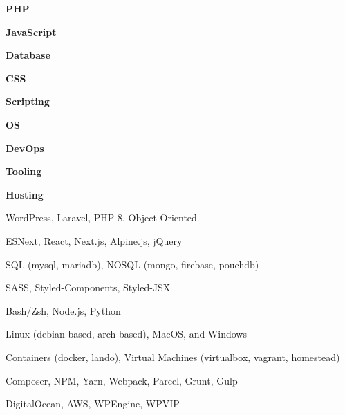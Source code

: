\documentclass{article}
\begin{document}
	\begin{multicols}{2}

		\textbf{PHP}
		\vspace{-1mm}

		\textbf{JavaScript}
		\vspace{-1mm}

		\textbf{Database}
		\vspace{-1mm}

		\textbf{CSS}
		\vspace{-1mm}

		\textbf{Scripting}
		\vspace{-1mm}

		\textbf{OS}
		\vspace{-1mm}

		\textbf{DevOps}
		\vspace{-1mm}

		\textbf{Tooling}
		\vspace{-1mm}

		\textbf{Hosting}
		\vspace{-1mm}

	\columnbreak

		WordPress, Laravel, PHP 8, Object-Oriented
		\vspace{-1mm}

		ESNext, React, Next.js, Alpine.js, jQuery
		\vspace{-1mm}

		SQL (mysql, mariadb), NOSQL (mongo, firebase, pouchdb)
		\vspace{-1mm}

		SASS, Styled-Components, Styled-JSX
		\vspace{-1mm}

		Bash/Zsh, Node.js, Python
		\vspace{-1mm}

		Linux (debian-based, arch-based), MacOS, and Windows
		\vspace{-1mm}

		Containers (docker, lando), Virtual Machines (virtualbox, vagrant, homestead)
		\vspace{-1mm}

		Composer, NPM, Yarn, Webpack, Parcel, Grunt, Gulp
		\vspace{-1mm}

		DigitalOcean, AWS, WPEngine, WPVIP
		\vspace{-1mm}

	\end{multicols}
\end{document}
